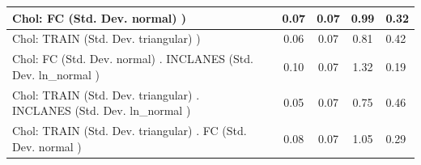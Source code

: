 \begin{table}
\begin{center}
\begin{tabular}{|l|l|c|c|c|l|}
			\hline
			 Chol: FC (Std. Dev. normal) ) &  & 0.07 & 0.07 & 0.99 & 0.32 \\
			\hline
			 Chol: TRAIN (Std. Dev. triangular) ) &  & 0.06 & 0.07 & 0.81 & 0.42 \\
			\hline
			 Chol: FC (Std. Dev. normal) . INCLANES (Std. Dev.   ln_normal ) &  & 0.10 & 0.07 & 1.32 & 0.19 \\
			\hline
			 Chol: TRAIN (Std. Dev. triangular) . INCLANES (Std. Dev.   ln_normal ) &  & 0.05 & 0.07 & 0.75 & 0.46 \\
			\hline
			 Chol: TRAIN (Std. Dev. triangular) . FC (Std. Dev.   normal ) &  & 0.08 & 0.07 & 1.05 & 0.29 \\
			\hline
		\end{tabular}
	\end{center}
\end{table}